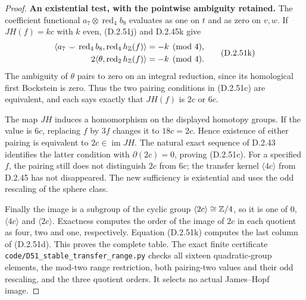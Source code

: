 \begin{proof}
\textbf{An existential test, with the pointwise ambiguity retained.}
The coefficient functional
$a_7\otimes\operatorname{red}_4b_8$ evaluates as one on
$t$ and as zero on $v,w$.  If $JH(f)=kc$ with $k$ even,
\textup{(D.2.51j)} and D.2.45k give
\[
 \begin{aligned}
 \langle a_7\smile\operatorname{red}_4b_8,
                   \operatorname{red}_4h_{\mathbb Z}(f)\rangle
        &=-k\pmod4,\\
 2\langle\theta,\operatorname{red}_2h_{\mathbb Z}(f)\rangle
        &=-k\pmod4.
 \end{aligned}
 \tag{D.2.51k}
\]
The ambiguity of $\theta$ pairs to zero on an integral
reduction, since its homological first Bockstein is zero.
Thus the two pairing conditions in \textup{(D.2.51c)}
are equivalent, and each says exactly that
$JH(f)$ is $2c$ or $6c$.

The map $JH$ induces a homomorphism on the displayed
homotopy groups.  If the value is $6c$, replacing $f$ by
$3f$ changes it to $18c=2c$.  Hence existence of either
pairing is equivalent to $2c\in\operatorname{im}JH$.
The natural exact sequence of D.2.43 identifies the latter
condition with $\partial(2c)=0$, proving
\textup{(D.2.51c)}.  For a specified $f$, the pairing
still does not distinguish $2c$ from $6c$; the transfer
kernel $\langle4c\rangle$ from D.2.45 has not disappeared.
The new sufficiency is existential and uses the odd
rescaling of the sphere class.

Finally the image is a subgroup of the cyclic group
$\langle2c\rangle\cong\mathbb Z/4$, so it is one of
$0$, $\langle4c\rangle$ and $\langle2c\rangle$.
Exactness computes the order of the image of $2c$ in
each quotient as four, two and one, respectively.
Equation \textup{(D.2.51k)} computes the last column of
\textup{(D.2.51d)}.  This proves the complete table.
The exact finite certificate
\texttt{code/D51\_stable\_transfer\_range.py} checks all sixteen
quadratic-group elements, the mod-two range restriction, both
pairing-two values and their odd rescaling, and the three quotient
orders. It selects no actual James--Hopf image.
\end{proof}
